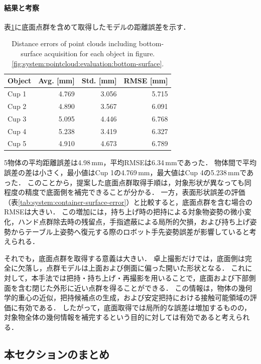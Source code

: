 \paragraph{結果と考察}

表\ref{tab:system:bottom-pointcloud}に底面点群を含めて取得したモデルの距離誤差を示す．

\begin{table}[t]
  \centering
  \caption{Distance errors of point clouds including bottom-surface acquisition for each object in figure.\ref{fig:system:pointcloud:evaluation:bottom-surface}.}
  \label{tab:system:bottom-pointcloud}
  \small
  \begin{tabular}{lrrr}
    \toprule
    \textbf{Object} & \textbf{Avg. [mm]} & \textbf{Std. [mm]} & \textbf{RMSE [mm]} \\
    \midrule
    Cup 1 & 4.769 & 3.056 & 5.715 \\
    Cup 2 & 4.890 & 3.567 & 6.091 \\
    Cup 3 & 5.095 & 4.446 & 6.768 \\
    Cup 4 & 5.238 & 3.419 & 6.327 \\
    Cup 5 & 4.910 & 4.673 & 6.789 \\
    \bottomrule
  \end{tabular}
\end{table}

5物体の平均距離誤差は4.98\,mm，平均RMSEは6.34\,mmであった．
物体間で平均誤差の差は小さく，最小値はCup 1の4.769\,mm，最大値はCup 4の5.238\,mmであった．
このことから，提案した底面点群取得手順は，対象形状が異なっても同程度の精度で底面側を補完できることが分かる．
一方，表面形状誤差の評価（表\ref{tab:system:container-surface-error}）と比較すると，底面点群を含む場合のRMSEは大きい．
この増加には，持ち上げ時の把持による対象物姿勢の微小変化，ハンド点群除去時の残留点，手指遮蔽による局所的欠損，および持ち上げ姿勢からテーブル上姿勢へ復元する際のロボット手先姿勢誤差が影響していると考えられる．

それでも，底面点群を取得する意義は大きい．
卓上撮影だけでは，底面側は完全に欠落し，点群モデルは上面および側面に偏った開いた形状となる．
これに対して，本手法では把持・持ち上げ・再撮影を用いることで，底面および下部側面を含む閉じた外形に近い点群を得ることができる．
この情報は，物体の幾何学的重心の近似，把持候補点の生成，および安定把持における接触可能領域の評価に有効である．
したがって，底面取得では局所的な誤差は増加するものの，対象物全体の幾何情報を補完するという目的に対しては有効であると考えられる．

\subsection{本セクションのまとめ}

